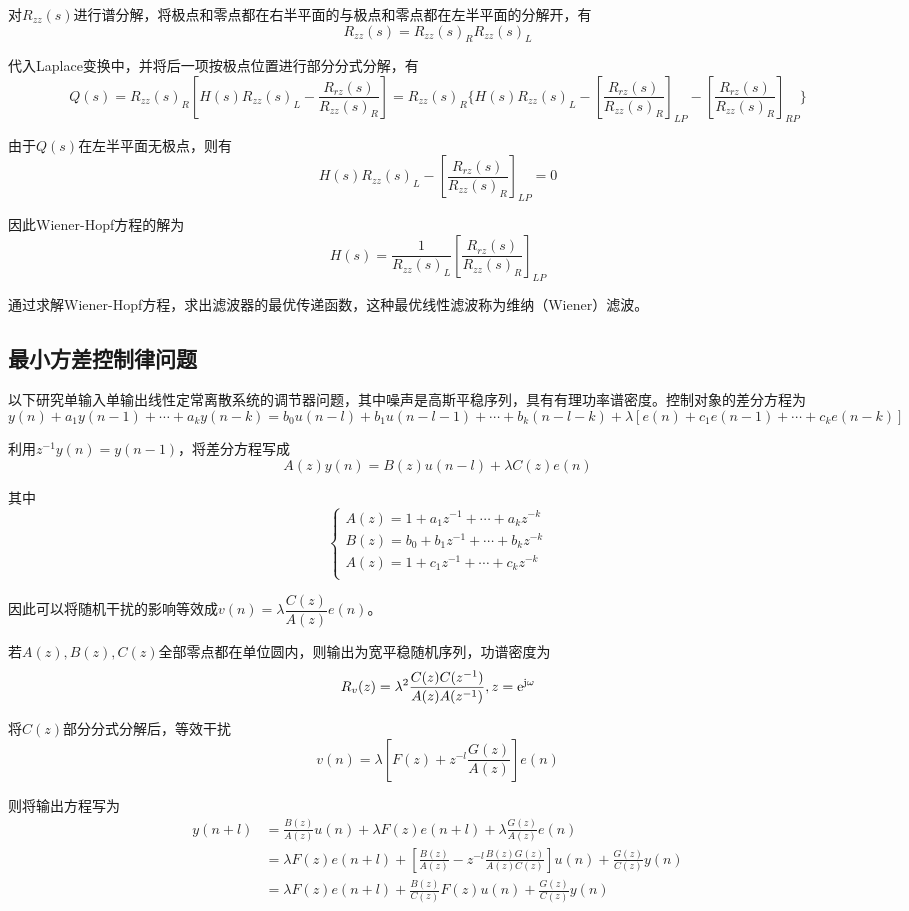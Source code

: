 \documentclass[11pt,a4paper]{ctexart}
\newcommand{\e}{{\rm e}}
\renewcommand{\j}{{\rm j}}
\begin{document}
        对$R_{zz}(s)$进行谱分解，将极点和零点都在右半平面的与极点和零点都在左半平面的分解开，有
        \[
        R_{zz}(s)=R_{zz}(s)_R R_{zz}(s)_L
        \]

        代入Laplace变换中，并将后一项按极点位置进行部分分式分解，有
        \[
        Q(s)=R_{zz}(s)_R[H(s)R_{zz}(s)_L-\frac{R_{rz}(s)}{R_{zz}(s)_R}]=R_{zz}(s)_R\{H(s)R_{zz}(s)_L-[\frac{R_{rz}(s)}{R_{zz}(s)_R}]_{LP}-[\frac{R_{rz}(s)}{R_{zz}(s)_R}]_{RP}\}
        \]

        由于$Q(s)$在左半平面无极点，则有
        \[
        H(s)R_{zz}(s)_L-[\frac{R_{rz}(s)}{R_{zz}(s)_R}]_{LP}=0
        \]

        因此Wiener-Hopf方程的解为
        \[
        H(s)=\frac{1}{R_{zz}(s)_L}[\frac{R_{rz}(s)}{R_{zz}(s)_R}]_{LP}
        \]

        通过求解Wiener-Hopf方程，求出滤波器的最优传递函数，这种最优线性滤波称为维纳（Wiener）滤波。
    \subsection{最小方差控制律问题}
        以下研究单输入单输出线性定常离散系统的调节器问题，其中噪声是高斯平稳序列，具有有理功率谱密度。控制对象的差分方程为
        \[
        y(n)+a_1y(n-1)+\cdots+a_ky(n-k)=b_0u(n-l)+b_1u(n-l-1)+\cdots+b_k(n-l-k)+\lambda[e(n)+c_1e(n-1)+\cdots+c_ke(n-k)]
        \]

        利用$z^{-1}y(n)=y(n-1)$，将差分方程写成
        \[
        A(z)y(n)=B(z)u(n-l)+\lambda C(z)e(n)
        \]

        其中
        \[
        \begin{cases}
        A(z)=1+a_1z^{-1}+\cdots+a_kz^{-k}\\
        B(z)=b_0+b_1z^{-1}+\cdots+b_kz^{-k}\\
        A(z)=1+c_1z^{-1}+\cdots+c_kz^{-k}\\
        \end{cases}
        \]

        因此可以将随机干扰的影响等效成$v(n)=\lambda\dfrac{C(z)}{A(z)}e(n)$。

        若$A(z),B(z),C(z)$全部零点都在单位圆内，则输出为宽平稳随机序列，功谱密度为
        \[
        R_v(z)=\lambda^2\frac{C(z)C(z^{-1})}{A(z)A(z^{-1})},z=\e^{\j\omega}
        \]

        将$C(z)$部分分式分解后，等效干扰
        \[
        v(n)=\lambda[F(z)+z^{-l}\frac{G(z)}{A(z)}]e(n)
        \]

        则将输出方程写为
        \begin{align*}
        y(n+l)&=\frac{B(z)}{A(z)}u(n)+\lambda F(z)e(n+l)+\lambda\frac{G(z)}{A(z)}e(n)\\
        &=\lambda F(z)e(n+l)+[\frac{B(z)}{A(z)}-z^{-l}\frac{B(z)G(z)}{A(z)C(z)}]u(n)+\frac{G(z)}{C(z)}y(n)\\
        &=\lambda F(z)e(n+l)+\frac{B(z)}{C(z)}F(z)u(n)+\frac{G(z)}{C(z)}y(n)
        \end{align*}
\end{document}
